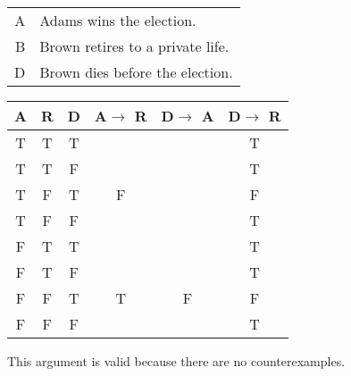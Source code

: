 \begin{tabular}{r l}
    A & Adams wins the election. \\
    B & Brown retires to a private life. \\
    D & Brown dies before the election.
\end{tabular}

\begin{tabular}{c|c|c||c|c||c}
    A & R & D & A$\rightarrow$ R & D$\rightarrow$ A & D$\rightarrow$ R \\
    \hline
    T & T & T &   &   & T \\
    T & T & F &   &   & T \\
    T & F & T & F &   & F \\
    T & F & F &   &   & T \\
    F & T & T &   &   & T \\
    F & T & F &   &   & T \\
    F & F & T & T & F & F \\
    F & F & F &   &   & T
\end{tabular}

\noindent This argument is valid because there are no counterexamples.
